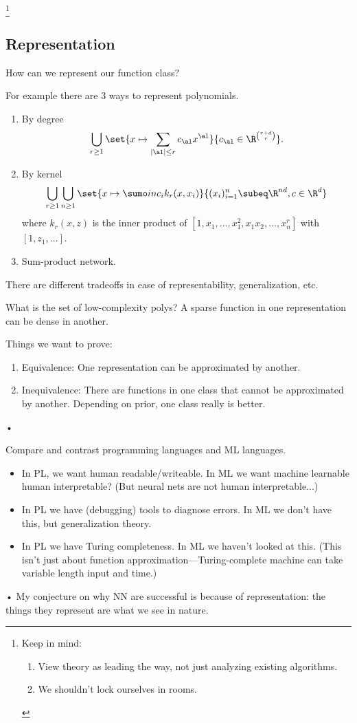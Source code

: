 \footnote{
Keep in mind:
\begin{enumerate}
\item
View theory as leading the way, not just analyzing existing algorithms.
\item
We shouldn't lock ourselves in rooms.
\end{enumerate}}

\subsection{Representation}

How can we represent our function class? 

For example there are 3 ways to represent polynomials.
\begin{enumerate}
\item
By degree
$$
\bigcup_{r\ge 1}\set{x\mapsto \sum_{|\al|\le r}c_\al x^\al}{c_\al \in \R^{\binom{r+d}r}}.
$$
\item
By kernel
$$
\bigcup_{r\ge 1} \bigcup_{n\ge 1} \set{x\mapsto \sumo in c_i k_r(x,x_i)}{(x_i)_{i=1}^n \subeq \R^{nd}, c\in \R^d}
$$
where $k_r(x,z)$ is the inner product of $[1, x_1,\ldots, x_1^2, x_1x_2,\ldots, x_n^{r}]$ with $[1, z_1,\ldots]$.
\item
Sum-product network.
\end{enumerate}
There are different tradeoffs in ease of representability, generalization, etc. 

What is the set of low-complexity polys? A sparse function in one representation can be dense in another.

Things we want to prove: 
\begin{enumerate}
\item
Equivalence: One representation can be approximated by another.
\item
Inequivalence: There are functions in one class that cannot be approximated by another. Depending on prior, one class really is better.
\end{enumerate}•

Compare and contrast programming languages and ML languages.
\begin{itemize}
\item
In PL, we want human readable/writeable. In ML we want machine learnable human interpretable? (But neural nets are not human interpretable...)
\item
In PL we have (debugging) tools to diagnose errors.
In ML we don't have this, but generalization theory.
\item
In PL we have Turing completeness. In ML we haven't looked at this.
(This isn't just about function approximation---Turing-complete machine can take variable length input and time.)
\end{itemize}•
My conjecture on why NN are successful is because of representation: the things they represent are what we see in nature.

